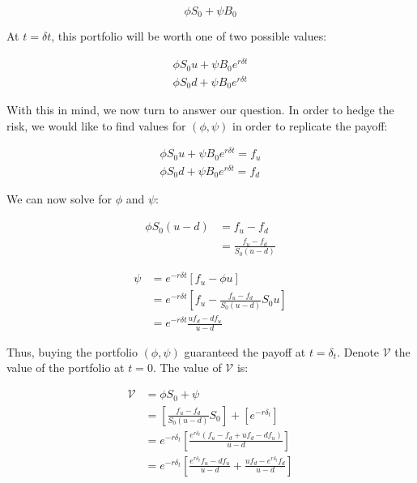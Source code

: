 \documentclass{article}
\begin{document}
\begin{equation*}
    \phi S_0 + \psi B_0
\end{equation*}

At $t=\delta t$, this portfolio will be worth one of two possible values:

\begin{align*}
    \phi S_0u + \psi B_0e^{r \delta t}\\
    \phi S_0d + \psi B_0e^{r \delta t}
\end{align*}

With this in mind, we now turn to answer our question. In order to hedge the risk, we would like to find values for $(\phi, \psi)$ in order to replicate the payoff:

\begin{align*}
    \phi S_0u + \psi B_0e^{r \delta t} = f_u\\
    \phi S_0d + \psi B_0e^{r \delta t} = f_d
\end{align*}

We can now solve for $\phi$ and $\psi$:

\begin{align*}
    \phi S_0(u - d) &= f_u - f_d\\
                    &= \frac{f_u - f_d}{S_0(u-d)}
\end{align*}

\begin{align*}
    \psi &= e^{-r\delta t} [f_u - \phi u]\\
         &= e^{-r\delta t} \left[f_u - \frac{f_u - f_d}{S_0(u - d)} S_0u\right]\\
         &= e^{-r\delta t} \frac{uf_d - df_u}{u -d}
\end{align*}

Thus, buying the portfolio $(\phi, \psi)$ guaranteed the payoff at $t=\delta_t$. Denote $\mathcal{V}$ the value of the portfolio at $t=0$. The value of $\mathcal{V}$ is:

\begin{align*}
    \mathcal{V} &= \phi S_0 + \psi\\
                &= \left[\frac{f_u - f_d}{S_0(u - d)}S_0\right] + \left[e^{-r\delta_t}\right]\\
                &= e^{-r\delta_t}\left[\frac{e^{r\delta_t}(f_u - f_d + uf_d - df_u)}{u - d}\right]\\
                &= e^{-r\delta_t}\left[\frac{e^{r\delta_t}f_u - df_u}{u-d} + \frac{uf_d - e^{r\delta_t}f_d}{u-d}\right]
\end{align*}
\end{document}
